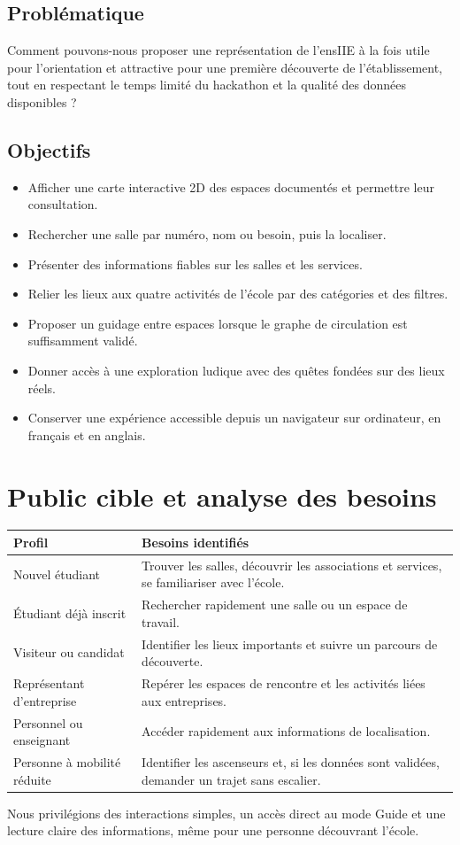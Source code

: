 \documentclass[11pt,a4paper]{article}
\begin{document}
\subsection{Problématique}
Comment pouvons-nous proposer une représentation de l'ensIIE à la fois utile pour l'orientation et attractive pour une première découverte de l'établissement, tout en respectant le temps limité du hackathon et la qualité des données disponibles ?

\subsection{Objectifs}
\begin{itemize}
\item Afficher une carte interactive 2D des espaces documentés et permettre leur consultation.
\item Rechercher une salle par numéro, nom ou besoin, puis la localiser.
\item Présenter des informations fiables sur les salles et les services.
\item Relier les lieux aux quatre activités de l'école par des catégories et des filtres.
\item Proposer un guidage entre espaces lorsque le graphe de circulation est suffisamment validé.
\item Donner accès à une exploration ludique avec des quêtes fondées sur des lieux réels.
\item Conserver une expérience accessible depuis un navigateur sur ordinateur, en français et en anglais.
\end{itemize}

\section{Public cible et analyse des besoins}
\begin{longtable}{p{}p{}}
\toprule Profil & Besoins identifiés \\ \midrule
Nouvel étudiant & Trouver les salles, découvrir les associations et services, se familiariser avec l'école.\\
Étudiant déjà inscrit & Rechercher rapidement une salle ou un espace de travail.\\
Visiteur ou candidat & Identifier les lieux importants et suivre un parcours de découverte.\\
Représentant d'entreprise & Repérer les espaces de rencontre et les activités liées aux entreprises.\\
Personnel ou enseignant & Accéder rapidement aux informations de localisation.\\
Personne à mobilité réduite & Identifier les ascenseurs et, si les données sont validées, demander un trajet sans escalier.\\
\bottomrule
\end{longtable}
Nous privilégions des interactions simples, un accès direct au mode Guide et une lecture claire des informations, même pour une personne découvrant l'école.
\end{document}
